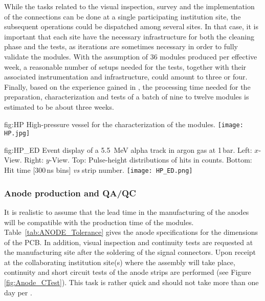 While the tasks related to the  visual inspection, survey and the implementation of the   connections can be done at 
a single participating institution %
site, the subsequent operations could be dispatched among several sites. In that case, it is  important that each %
site %
have the necessary infrastructure for 
both the cleaning phase and the  tests, as iterations are sometimes necessary in order to fully validate the 
 modules. With the assumption of \num{36}  modules produced per effective week, a reasonable number of setups needed for the   tests, together with their associated instrumentation and infrastructure, could amount to three or four. Finally, based on the experience gained in  , the processing time needed for the preparation, characterization and tests of a batch of nine to twelve  modules is estimated to be about three weeks.  

\begin{dunefigure}
{fig:HP} 
{High-pressure vessel for the characterization of the    modules.}
  \texttt{[image: HP.jpg]}
\end{dunefigure}


\begin{dunefigure}
{fig:HP_ED}
{Event display of a \SI{5.5}{MeV} alpha track in argon gas at \num{1}\,bar.  Left: $x$-View. Right: $y$-View. Top: Pulse-height distributions of hits in  counts. Bottom: Hit time [300\,ns bins] \textit{vs} strip number.}
\texttt{[image: HP\_ED.png]}
\end{dunefigure}

\subsubsection{Anode production and QA/QC}
\label{sec:fddp-crp-ANODEprod}
It is realistic to assume that the lead time in the manufacturing of the anodes will be compatible with the production time
of the  modules. Table~\ref{tab:ANODE_Tolerance} gives the anode specifications for the dimensions of the PCB. In addition, visual inspection and continuity tests are requested at the manufacturing site after the soldering of the signal connectors. Upon receipt at the collaborating institution site(s) where the  assembly will take place, continuity and short circuit tests of the anode strips are performed (see Figure \ref{fig:Anode_CTest}). This task is rather quick and should not take more than one day per .  


